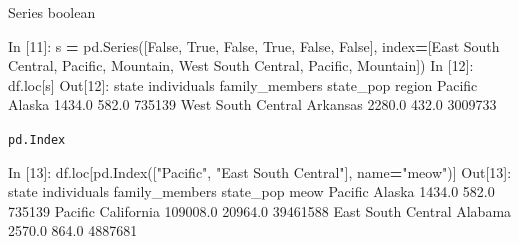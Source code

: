 \documentclass[
]{book}
\newenvironment{Shaded}{\begin{snugshade}}{\end{snugshade}}
\newcommand{\DecValTok}[1]{\textcolor[rgb]{0.00,0.00,0.81}{#1}}
\newcommand{\FloatTok}[1]{\textcolor[rgb]{0.00,0.00,0.81}{#1}}
\newcommand{\NormalTok}[1]{#1}
\newcommand{\OperatorTok}[1]{\textcolor[rgb]{0.81,0.36,0.00}{\textbf{#1}}}
\newcommand{\StringTok}[1]{\textcolor[rgb]{0.31,0.60,0.02}{#1}}
\newcommand{\VariableTok}[1]{\textcolor[rgb]{0.00,0.00,0.00}{#1}}
\begin{document}
Series boolean

\begin{Shaded}
\begin{Highlighting}[]
\NormalTok{In [}\DecValTok{11}\NormalTok{]: s }\OperatorTok{=}\NormalTok{ pd.Series([}\VariableTok{False}\NormalTok{, }\VariableTok{True}\NormalTok{, }\VariableTok{False}\NormalTok{, }\VariableTok{True}\NormalTok{, }\VariableTok{False}\NormalTok{, }\VariableTok{False}\NormalTok{],}
\NormalTok{              index}\OperatorTok{=}\NormalTok{[}\StringTok{\textquotesingle{}East South Central\textquotesingle{}}\NormalTok{, }\StringTok{\textquotesingle{}Pacific\textquotesingle{}}\NormalTok{, }\StringTok{\textquotesingle{}Mountain\textquotesingle{}}\NormalTok{, }\StringTok{\textquotesingle{}West South Central\textquotesingle{}}\NormalTok{, }\StringTok{\textquotesingle{}Pacific\textquotesingle{}}\NormalTok{, }\StringTok{\textquotesingle{}Mountain\textquotesingle{}}\NormalTok{])}
\NormalTok{In [}\DecValTok{12}\NormalTok{]: df.loc[s]}
\NormalTok{Out[}\DecValTok{12}\NormalTok{]:}
\NormalTok{                       state  individuals  family\_members  state\_pop}
\NormalTok{region                                                              }
\NormalTok{Pacific               Alaska       }\FloatTok{1434.0}           \FloatTok{582.0}     \DecValTok{735139}
\NormalTok{West South Central  Arkansas       }\FloatTok{2280.0}           \FloatTok{432.0}    \DecValTok{3009733}
\end{Highlighting}
\end{Shaded}

\texttt{pd.Index}

\begin{Shaded}
\begin{Highlighting}[]
\NormalTok{In [}\DecValTok{13}\NormalTok{]: df.loc[pd.Index([}\StringTok{"Pacific"}\NormalTok{, }\StringTok{"East South Central"}\NormalTok{], name}\OperatorTok{=}\StringTok{"meow"}\NormalTok{)]}
\NormalTok{Out[}\DecValTok{13}\NormalTok{]:}
\NormalTok{                         state  individuals  family\_members  state\_pop}
\NormalTok{meow                                                                   }
\NormalTok{Pacific                 Alaska       }\FloatTok{1434.0}           \FloatTok{582.0}     \DecValTok{735139}
\NormalTok{Pacific             California     }\FloatTok{109008.0}         \FloatTok{20964.0}   \DecValTok{39461588}
\NormalTok{East South Central     Alabama       }\FloatTok{2570.0}           \FloatTok{864.0}    \DecValTok{4887681}
\end{Highlighting}
\end{Shaded}
\end{document}
